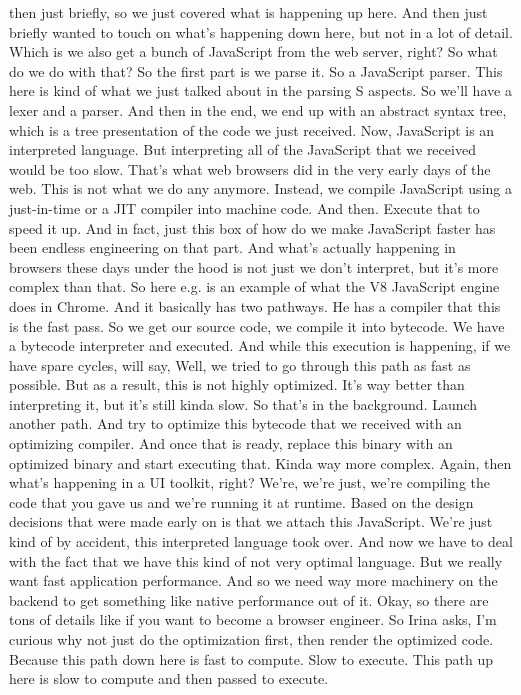then just briefly, so we just covered what is happening up here. And then just briefly wanted to touch on what's happening down here, but not in a lot of detail. Which is we also get a bunch of JavaScript from the web server, right? So what do we do with that? So the first part is we parse it. So a JavaScript parser. This here is kind of what we just talked about in the parsing S aspects. So we'll have a lexer and a parser. And then in the end, we end up with an abstract syntax tree, which is a tree presentation of the code we just received. Now, JavaScript is an interpreted language. But interpreting all of the JavaScript that we received would be too slow. That's what web browsers did in the very early days of the web. This is not what we do any anymore. Instead, we compile JavaScript using a just-in-time or a JIT compiler into machine code. And then. Execute that to speed it up. And in fact, just this box of how do we make JavaScript faster has been endless engineering on that part. And what's actually happening in browsers these days under the hood is not just we don't interpret, but it's more complex than that. So here e.g. is an example of what the V8 JavaScript engine does in Chrome. And it basically has two pathways. He has a compiler that this is the fast pass. So we get our source code, we compile it into bytecode. We have a bytecode interpreter and executed. And while this execution is happening, if we have spare cycles, will say, Well, we tried to go through this path as fast as possible. But as a result, this is not highly optimized. It's way better than interpreting it, but it's still kinda slow. So that's in the background. Launch another path. And try to optimize this bytecode that we received with an optimizing compiler. And once that is ready, replace this binary with an optimized binary and start executing that. Kinda way more complex. Again, then what's happening in a UI toolkit, right? We're, we're just, we're compiling the code that you gave us and we're running it at runtime. Based on the design decisions that were made early on is that we attach this JavaScript. We're just kind of by accident, this interpreted language took over. And now we have to deal with the fact that we have this kind of not very optimal language. But we really want fast application performance. And so we need way more machinery on the backend to get something like native performance out of it. Okay, so there are tons of details like if you want to become a browser engineer. So Irina asks, I'm curious why not just do the optimization first, then render the optimized code. Because this path down here is fast to compute. Slow to execute. This path up here is slow to compute and then passed to execute. 

